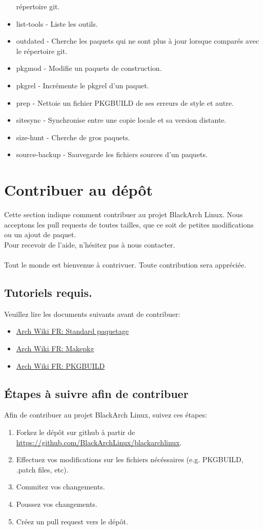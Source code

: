 \documentclass[a4paper, oneside, 11pt]{book}
\begin{document}
\begin{itemize}
répertoire git.
\item list-tools - Liste les outils.
\item outdated - Cherche les paquets qui ne sont plus à jour lorsque comparés
avec le répertoire git.
\item pkgmod - Modifie un paquets de construction.
\item pkgrel - Incrémente le pkgrel d'un paquet.
\item prep - Nettoie un fichier PKGBUILD de ses erreurs de style et autre.
\item sitesync - Synchronise entre une copie locale et sa version distante.
\item size-hunt - Cherche de gros paquets.
\item source-backup - Sauvegarde les fichiers sources d'un paquets.
\end{itemize}

\section{Contribuer au dépôt}
Cette section indique comment contribuer au projet BlackArch Linux. Nous
acceptons les pull requests de toutes tailles, que ce soit de petites
modifications ou un ajout de paquet.\\Pour recevoir de l'aide, n'hésitez pas à
nous contacter.
\\\\
Tout le monde est bienvenue à contrivuer. Toute contribution sera appréciée.

\subsection{Tutoriels requis.}
Veuillez lire les documents suivants avant de contribuer:
\begin{itemize}
\item \href{http://wiki.archlinux.fr/Standard_paquetage}{Arch Wiki FR:
Standard paquetage}
\item \href{http://wiki.archlinux.fr/Makepkg}{Arch Wiki FR: Makepkg}
\item \href{http://wiki.archlinux.fr/PKGBUILD}{Arch Wiki FR: PKGBUILD}
\end{itemize}

\subsection{Étapes à suivre afin de contribuer}
Afin de contribuer au projet BlackArch Linux, suivez ces étapes:
\begin{enumerate}
\item Forkez le dépôt sur github à partir de
\url{https://github.com/BlackArchLinux/blackarchlinux}.
\item Effectuez vos modifications sur les fichiers nécéssaires (e.g. PKGBUILD,
.patch files, etc).
\item Commitez vos changements.
\item Poussez vos changements.
\item Créez un pull request vers le dépôt.
\end{enumerate}
\end{document}
